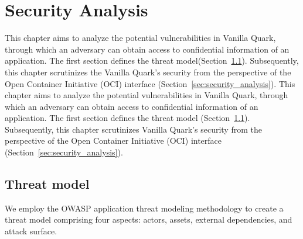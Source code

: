 \chapter{Security Analysis}
\label{sec:security_analyse}





This chapter aims to analyze the potential vulnerabilities in Vanilla Quark, through which an adversary can obtain access to confidential information of an application. The first section defines the threat model(Section~\ref{sec:Threat_model}). 
Subsequently, this chapter scrutinizes the Vanilla Quark's security from the perspective of the Open Container Initiative (OCI) interface (Section~\ref{sec:security_analysis}).
This chapter aims to analyze the potential vulnerabilities in Vanilla Quark, through which an adversary can obtain access to confidential information of an application. The first section defines the threat model (Section~\ref{sec:Threat_model}). 
Subsequently, this chapter scrutinizes Vanilla Quark's security from the perspective of the Open Container Initiative (OCI) interface~\cite*{oci-runtime-spec} (Section~\ref{sec:security_analysis}).

\section{Threat model}
\label{sec:Threat_model}
We employ the OWASP application threat modeling methodology\cite*{OWASP_Threat_Modeling} to create a threat model comprising four aspects: actors, assets, external dependencies, and attack surface. 


